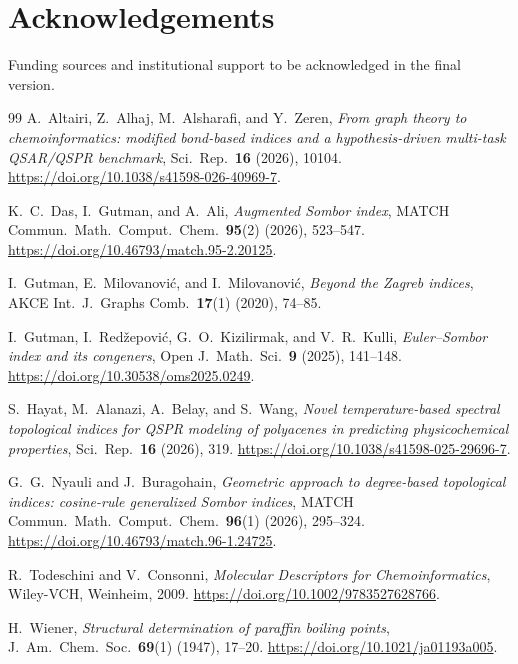 \documentclass[11pt,a4paper]{article}
\theoremstyle{definition}
\begin{document}
\section*{Acknowledgements}
Funding sources and institutional support to be acknowledged in the
final version.

\clearpage
\begin{thebibliography}{99}
\small
{}
A.~Altairi, Z.~Alhaj, M.~Alsharafi, and Y.~Zeren,
\emph{From graph theory to chemoinformatics: modified bond-based indices and a hypothesis-driven multi-task QSAR/QSPR benchmark},
Sci.~Rep.~\textbf{16} (2026), 10104.
\url{https://doi.org/10.1038/s41598-026-40969-7}.

K.~C.~Das, I.~Gutman, and A.~Ali,
\emph{Augmented {Sombor} index},
MATCH Commun.~Math.~Comput.~Chem.~\textbf{95}(2) (2026), 523--547.
\url{https://doi.org/10.46793/match.95-2.20125}.

I.~Gutman, E.~Milovanovi\'c, and I.~Milovanovi\'c,
\emph{Beyond the {Zagreb} indices},
AKCE Int.~J.~Graphs Comb.~\textbf{17}(1) (2020), 74--85.

I.~Gutman, I.~Red\v{z}epovi\'c, G.~O.~Kizilirmak, and V.~R.~Kulli,
\emph{{Euler}--{Sombor} index and its congeners},
Open J.~Math.~Sci.~\textbf{9} (2025), 141--148.
\url{https://doi.org/10.30538/oms2025.0249}.

S.~Hayat, M.~Alanazi, A.~Belay, and S.~Wang,
\emph{Novel temperature-based spectral topological indices for {QSPR} modeling of polyacenes in predicting physicochemical properties},
Sci.~Rep.~\textbf{16} (2026), 319.
\url{https://doi.org/10.1038/s41598-025-29696-7}.

G.~G.~Nyauli and J.~Buragohain,
\emph{Geometric approach to degree-based topological indices: cosine-rule generalized {Sombor} indices},
MATCH Commun.~Math.~Comput.~Chem.~\textbf{96}(1) (2026), 295--324.
\url{https://doi.org/10.46793/match.96-1.24725}.

R.~Todeschini and V.~Consonni,
\emph{Molecular Descriptors for Chemoinformatics},
Wiley-VCH, Weinheim, 2009.
\url{https://doi.org/10.1002/9783527628766}.

H.~Wiener,
\emph{Structural determination of paraffin boiling points},
J.~Am.~Chem.~Soc.~\textbf{69}(1) (1947), 17--20.
\url{https://doi.org/10.1021/ja01193a005}.


\end{thebibliography}
\end{document}
